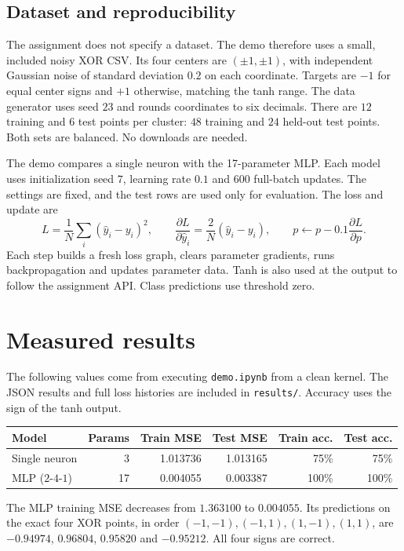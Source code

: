 \documentclass[11pt,a4paper]{article}
\newcommand{\code}[1]{\texttt{#1}}
\begin{document}
\subsection{Dataset and reproducibility}
The assignment does not specify a dataset. The demo therefore uses a small,
included noisy XOR CSV. Its four centers are $(\pm1,\pm1)$, with independent
Gaussian noise of standard deviation $0.2$ on each coordinate. Targets are
$-1$ for equal center signs and $+1$ otherwise, matching the tanh range.
The data generator uses seed $23$ and rounds coordinates to six decimals.
There are $12$ training and $6$ test points per cluster: $48$ training and
$24$ held-out test points. Both sets are balanced. No downloads are needed.

The demo compares a single neuron with the 17-parameter MLP. Each model uses
initialization seed $7$, learning rate $0.1$ and $600$ full-batch updates.
The settings are fixed, and the test rows are used only for evaluation.
The loss and update are
\[
L=\frac1N\sum_i(\hat y_i-y_i)^2,\qquad
\frac{\partial L}{\partial\hat y_i}=\frac2N(\hat y_i-y_i),\qquad
p\leftarrow p-0.1\frac{\partial L}{\partial p}.
\]
Each step builds a fresh loss graph, clears parameter gradients, runs
backpropagation and updates parameter data. Tanh is also used at the output
to follow the assignment API. Class predictions use threshold zero.

\newpage
\section{Measured results}
The following values come from executing \code{demo.ipynb} from a clean
kernel. The JSON results and full loss histories are included in
\code{results/}. Accuracy uses the sign of the tanh output.

\begin{center}
\begin{tabular}{lrrrrr}
\toprule
Model & Params & Train MSE & Test MSE & Train acc. & Test acc.\\
\midrule
Single neuron & 3 & 1.013736 & 1.013165 & 75\% & 75\%\\
MLP ($2$-$4$-$1$) & 17 & 0.004055 & 0.003387 & 100\% & 100\%\\
\bottomrule
\end{tabular}
\end{center}
The MLP training MSE decreases from $1.363100$ to $0.004055$. Its predictions
on the exact four XOR points, in order $(-1,-1),(-1,1),(1,-1),(1,1)$, are
$-0.94974$, $0.96804$, $0.95820$ and $-0.95212$. All four signs are correct.
\end{document}
